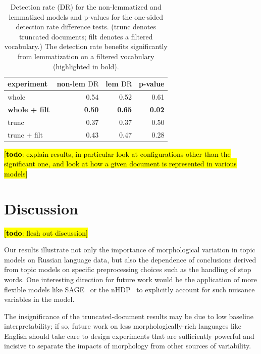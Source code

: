 \documentclass[11pt,letterpaper]{article}
\newcommand{\DR}{\ensuremath{\textrm{DR}}}
\newcommand{\Note}[3]{\sethlcolor{#2}\hl{[\textbf{#1}: #3]}}
\newcommand{\todo}[1]{\Note{todo}{lightred}{#1}}
\begin{document}
{\begin{table}
    \begin{tabular}{l|rr|r}
        experiment            & non-lem $\DR$ &     lem $\DR$ &       p-value \\\hline
        whole                 &          0.54 &          0.52 &          0.61 \\
        \textbf{whole + filt} & \textbf{0.50} & \textbf{0.65} & \textbf{0.02} \\
        trunc                 &          0.37 &          0.37 &          0.50 \\
        trunc + filt          &          0.43 &          0.47 &          0.28 \\
    \end{tabular}
    \caption{Detection rate ($\DR$) for the non-lemmatized and
        lemmatized models
        and p-values for the one-sided detection rate difference tests.
        (trunc denotes truncated documents; filt denotes a filtered
        vocabulary.)
        The detection rate benefits significantly from lemmatization on
        a filtered vocabulary (highlighted in bold).}
    \label{tab:detection-rate}
\end{table}

\todo{explain results, in particular look at configurations other than
    the significant one, and look at how a given document is
    represented in various models}


\section{Discussion}\label{sec:discussion}

\todo{flesh out discussion}

Our results illustrate not only the importance of morphological
variation in topic models on Russian language data, but also the
dependence of conclusions derived from topic models on specific
preprocessing choices such as the handling of stop words.  One
interesting direction for future work would be the application of more
flexible models like SAGE~\cite{eisenstein2011} or the
nHDP~\cite{paisley2015} to explicitly account for such nuisance
variables in the model.

The insignificance of the truncated-document
results may be due to low baseline interpretability; if so, future work
on less morphologically-rich languages like English should take care
to design experiments that are sufficiently powerful and incisive to
separate the impacts of morphology from other sources of variability.


}
\end{document}
